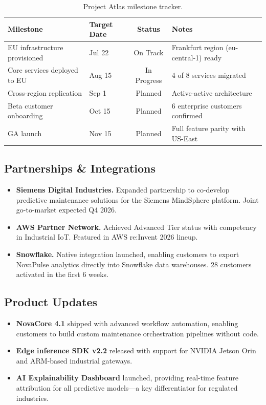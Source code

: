 \documentclass[
    language=english,
    doctype=stakeholder-report,
    institution=none,
]{../../omnilatex}
\begin{document}
\begin{table}[h]
    \centering
    \begin{tabular}{llcp{4cm}}
        \toprule
        \textbf{Milestone} & \textbf{Target Date} & \textbf{Status} & \textbf{Notes} \\
        \midrule
        EU infrastructure provisioned & Jul 22 & \cellcolor{green!20}On Track & Frankfurt region (eu-central-1) ready \\
        Core services deployed to EU  & Aug 15 & \cellcolor{yellow!20}In Progress & 4 of 8 services migrated \\
        Cross-region replication       & Sep 1  & Planned & Active-active architecture \\
        Beta customer onboarding      & Oct 15 & Planned & 6 enterprise customers confirmed \\
        GA launch                      & Nov 15 & Planned & Full feature parity with US-East \\
        \bottomrule
    \end{tabular}
    \caption{Project Atlas milestone tracker.}
\end{table}

\subsection{Partnerships \& Integrations}

\begin{itemize}
    \item \textbf{Siemens Digital Industries.} Expanded partnership to
        co-develop predictive maintenance solutions for the Siemens
        MindSphere platform. Joint go-to-market expected Q4 2026.
    \item \textbf{AWS Partner Network.} Achieved Advanced Tier status
        with competency in Industrial IoT. Featured in AWS re:Invent 2026
        lineup.
    \item \textbf{Snowflake.} Native integration launched, enabling
        customers to export NovaPulse analytics directly into Snowflake
        data warehouses. 28 customers activated in the first 6 weeks.
\end{itemize}

\subsection{Product Updates}

\begin{itemize}
    \item \textbf{NovaCore 4.1} shipped with advanced workflow automation,
        enabling customers to build custom maintenance orchestration
        pipelines without code.
    \item \textbf{Edge inference SDK v2.2} released with support for
        NVIDIA Jetson Orin and ARM-based industrial gateways.
    \item \textbf{AI Explainability Dashboard} launched, providing
        real-time feature attribution for all predictive models---a key
        differentiator for regulated industries.
\end{itemize}
\end{document}
